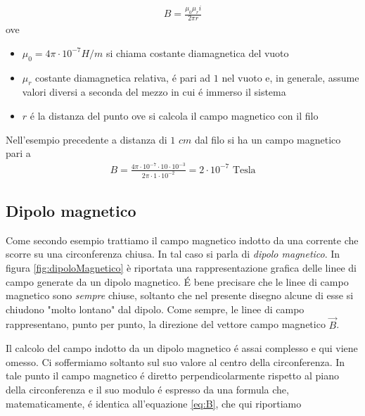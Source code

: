 \documentclass[17pt]{extarticle}
\begin{document}
\begin{enumerate}
\begin{eqnarray}\label{eq:B}
	B = \frac{\mu_0\mu_r i}{2\pi r}
\end{eqnarray}
ove

\begin{itemize}
	\item $\mu_0 = 4\pi\cdot 10^{-7}H/m$ si chiama costante diamagnetica del vuoto
	\item $\mu_r$ costante diamagnetica relativa, \'e pari ad $1$ nel vuoto e, in generale, assume valori diversi a seconda del mezzo in cui \'e immerso il sistema
	\item $r$ \'e la distanza del punto ove si calcola il campo magnetico con il filo
\end{itemize}



Nell'esempio precedente a distanza di $1$ $cm$ dal filo si ha un campo magnetico pari a 
\begin{eqnarray}
	B = \frac{4\pi\cdot 10^{-7}\cdot 10\cdot 10^{-3}}{2\pi \cdot 1\cdot 10^{-2}} = 2\cdot 10^{-7} \textrm{ Tesla}
\end{eqnarray}





\subsection{Dipolo magnetico}




Come secondo esempio trattiamo il campo magnetico indotto da una corrente che scorre su una circonferenza chiusa. In tal caso si parla di \emph{dipolo magnetico}. In figura \ref{fig:dipoloMagnetico} è riportata una rappresentazione grafica delle linee di campo generate da un dipolo magnetico. \'E bene precisare che le linee di campo magnetico sono \emph{sempre} chiuse, soltanto che nel presente disegno alcune di esse si chiudono "molto lontano" dal dipolo.
Come sempre, le linee di campo rappresentano, punto per punto, la direzione del vettore campo magnetico $\vec{B}$. 

Il calcolo del campo indotto da un dipolo magnetico \'e assai complesso e qui viene omesso. Ci soffermiamo soltanto sul suo valore al centro della circonferenza. In tale punto il campo magnetico \'e diretto perpendicolarmente rispetto al piano della circonferenza e il suo modulo \'e espresso da una formula che, matematicamente, \'e identica all'equazione \ref{eq:B}, che qui riportiamo





















\end{enumerate}
\end{document}
